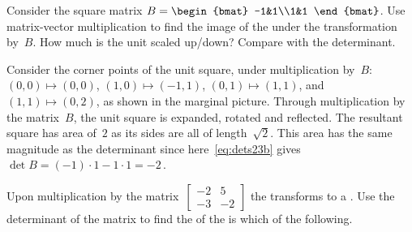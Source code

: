 \begin{example} \label{eg:detarea2}
Consider the square matrix \(B=\begin{bmat} -1&1\\1&1 \end{bmat}\).
Use matrix-vector multiplication to find the image of the  under the transformation by~\(B\).
How much is the unit  scaled up/down?  
Compare with the determinant.
\begin{solution} 
Consider the corner points of the unit square, under multiplication by~\(B\): 
%
\((0,0)\mapsto(0,0)\)\index{$\mapsto$}, \((1,0)\mapsto(-1,1)\), \((0,1)\mapsto(1,1)\), and \((1,1)\mapsto(0,2)\), as shown in the marginal picture.
Through multiplication by the matrix~\(B\), the unit square is expanded, rotated and reflected.
The resultant square has area of~\(2\) as its sides are all of length~\(\sqrt2\).
This area has the same magnitude as the determinant since here~\eqref{eq:dets23b} gives \(\det B=(-1)\cdot1-1\cdot1=-2\)\,.
\end{solution}
\end{example}



\begin{activity}
Upon multiplication by the matrix~\(\begin{bmatrix} -2&5\\-3&-2 \end{bmatrix}\) the  transforms to a .
Use the determinant of the matrix to find the  of the  is which of the following.
\end{activity}



